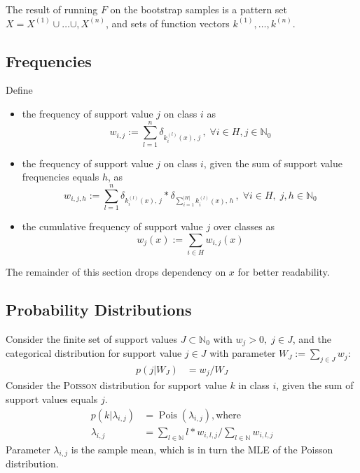 \documentclass{article}
\begin{document}
The result of running $F$ on the bootstrap samples is a pattern set $X= X^{(1)}\cup\ldots\cup,X^{(n)}$, and sets of function vectors $k^{(1)},\ldots,k^{(n)}$.

\subsection{Frequencies}
Define
\begin{itemize}
  \item the frequency of support value $j$ on class $i$ as 
    \begin{equation}
        w_{i,j}:=\sum_{l=1}^n \delta_{k_i^{(l)}(x),\, j}\, , \; \forall i \in H, j \in \mathbb{N}_0
    \end{equation}
  \item the frequency of support value $j$ on class $i$, given the sum of support value frequencies equals $h$, as 
    \begin{equation}
      w_{i,j,h}:=\sum_{l=1}^n \delta_{k_i^{(l)}(x),\, j} * \delta_{\sum_{i=1}^{\vert H \vert}k_i^{(l)}(x),\, h}\, , \; \forall i \in H, \; j,h \in \mathbb{N}_0
    \end{equation}
  \item the cumulative frequency of support value $j$ over classes as 
    \begin{equation}
      w_j(x):=\sum_{i \in H}w_{i,j}(x)
    \end{equation}
\end{itemize}
The remainder of this section drops dependency on $x$ for better readability.

\subsection{Probability Distributions}
Consider the finite set of support values $J \subset \mathbb{N}_0$ with $w_j > 0, \; j \in J$, and the categorical distribution for support value $j \in J$ with parameter $W_J:=\sum_{j \in J} w_j$:
\begin{align}
  p(j|W_J) &= w_j/W_J
\end{align}
Consider the \textsc{Poisson} distribution for support value $k$ in class $i$, given the sum of support values equals $j$.
\begin{align}
  p(k\vert\lambda_{i,j}) &= \operatorname{Pois}\left(\lambda_{i,j}\right), \text{where}\\
  \lambda_{i,j}&=\sum_{l \in \mathbb{N}} l*w_{i,l,j} / \sum_{l \in \mathbb{N}} w_{i,l,j}
\end{align}
Parameter $\lambda_{i,j}$ is the sample mean, which is in turn the MLE of the Poisson distribution.
\end{document}
